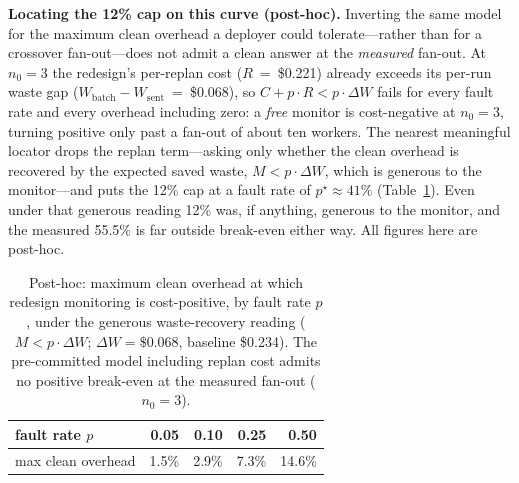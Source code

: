 \documentclass[acmsmall,screen]{acmart}
\begin{document}
\textbf{Locating the 12\% cap on this curve (post-hoc).} Inverting the same model
for the maximum clean overhead a deployer could tolerate---rather than for a
crossover fan-out---does not admit a clean answer at the \emph{measured} fan-out.
At $n_0=3$ the redesign's per-replan cost ($R$~=~\$0.221) already exceeds its
per-run waste gap ($W_{\mathrm{batch}}-W_{\mathrm{sent}}$~=~\$0.068), so
$C+p\cdot R<p\cdot\Delta W$ fails for every fault rate and every overhead
including zero: a \emph{free} monitor is cost-negative at $n_0=3$, turning
positive only past a fan-out of about ten workers. The nearest meaningful locator
drops the replan term---asking only whether the clean overhead is recovered by
the expected saved waste, $M<p\cdot\Delta W$, which is generous to the
monitor---and puts the 12\% cap at a fault rate of $p^\star\approx41\%$
(Table~\ref{tab:breakeven-locate}). Even under that generous reading 12\% was, if
anything, generous to the monitor, and the measured 55.5\% is far outside
break-even either way. All figures here are post-hoc.

\begin{table}[t]
\caption{Post-hoc: maximum clean overhead at which redesign monitoring is
cost-positive, by fault rate $p$, under the generous waste-recovery reading
($M<p\cdot\Delta W$; $\Delta W=\$0.068$, baseline \$0.234). The pre-committed
model including replan cost admits no positive break-even at the measured fan-out
($n_0=3$).}
\label{tab:breakeven-locate}
\begin{tabular}{lrrrr}
\toprule
fault rate $p$     & 0.05 & 0.10 & 0.25 & 0.50 \\
\midrule
max clean overhead & 1.5\% & 2.9\% & 7.3\% & 14.6\% \\
\bottomrule
\end{tabular}
\end{table}
\end{document}
